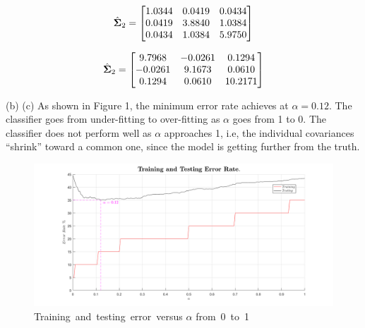 \documentclass[12pt]{article}
\begin{document}
\begin{equation*}
\begin{aligned}
\centering {\begin{matrix}
\hat{\bm{\Sigma}}_2  = \begin{bmatrix}
    1.0344  &  0.0419  &  0.0434 \\
    0.0419  &  3.8840  &  1.0384 \\
    0.0434  &  1.0384  &  5.9750
\end{bmatrix}
\end{matrix}}
\end{aligned}
\end{equation*}

\begin{equation*}
\begin{aligned}
\centering {\begin{matrix}
\hat{\bm{\Sigma}}_2  = \begin{bmatrix}
    9.7968  & -0.0261  &  0.1294\\
   -0.0261  &  9.1673  &  0.0610\\
    0.1294  &  0.0610  & 10.2171
\end{bmatrix}
\end{matrix}}
\end{aligned}
\end{equation*}

\vfill
\clearpage

\noindent(b) (c) As shown in Figure 1, the minimum error rate achieves at $\alpha=0.12$. The classifier goes from under-fitting to over-fitting as $\alpha$ goes from 1 to 0. The classifier does not perform well as $\alpha$ approaches 1, i.e, the individual covariances ``shrink'' toward a common one, since the model is getting further from the truth. \\

\begin{figure}[H]
\centering
\includegraphics[width = 1\textwidth]{1bc.png}
\caption{Training\ and\ testing\ error\ versus $\alpha$ from\ 0\ to\ 1}
\end{figure}
\end{document}
